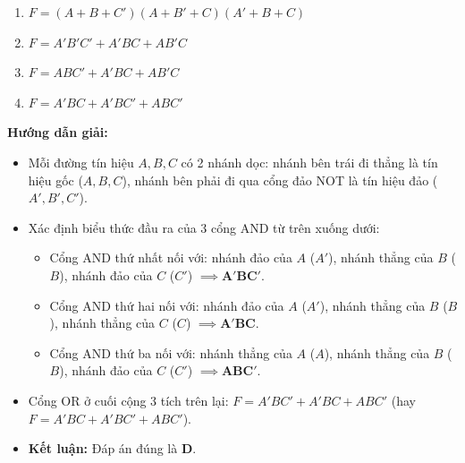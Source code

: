 \begin{enumerate}[label=\Alph*.]
    \item $F = (A + B + C')(A + B' + C)(A' + B + C)$
    \item $F = A'B'C' + A'BC + AB'C$
    \item $F = ABC' + A'BC + AB'C$
    \item $F = A'BC + A'BC' + ABC'$
\end{enumerate}
\textbf{Hướng dẫn giải:}
\begin{itemize}
    \item Mỗi đường tín hiệu $A, B, C$ có 2 nhánh dọc: nhánh bên trái đi thẳng là tín hiệu gốc ($A, B, C$), nhánh bên phải đi qua cổng đảo NOT là tín hiệu đảo ($A', B', C'$).
    \item Xác định biểu thức đầu ra của 3 cổng AND từ trên xuống dưới:
    \begin{itemize}
        \item Cổng AND thứ nhất nối với: nhánh đảo của $A$ ($A'$), nhánh thẳng của $B$ ($B$), nhánh đảo của $C$ ($C'$) $\implies \mathbf{A'BC'}$.
        \item Cổng AND thứ hai nối với: nhánh đảo của $A$ ($A'$), nhánh thẳng của $B$ ($B$), nhánh thẳng của $C$ ($C$) $\implies \mathbf{A'BC}$.
        \item Cổng AND thứ ba nối với: nhánh thẳng của $A$ ($A$), nhánh thẳng của $B$ ($B$), nhánh đảo của $C$ ($C'$) $\implies \mathbf{ABC'}$.
    \end{itemize}
    \item Cổng OR ở cuối cộng 3 tích trên lại: $F = A'BC' + A'BC + ABC'$ (hay $F = A'BC + A'BC' + ABC'$).
    \item \textbf{Kết luận:} Đáp án đúng là \textbf{D}.
\end{itemize}

